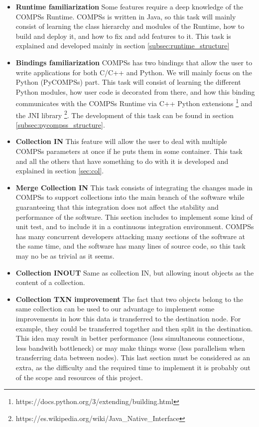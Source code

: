 \begin{itemize}
\item \textbf{Runtime familiarization} Some features require a deep knowledge of the COMPSs Runtime. COMPSs is written in Java, so this task will mainly consist of learning the class hierarchy and modules of the Runtime, how to build and deploy it, and how to fix and add features to it. This task is explained and developed mainly in section \ref{subsec:runtime_structure}

\item \textbf{Bindings familiarization} COMPSs has two bindings that allow the user to write applications for both C/C++ and Python. We will mainly focus on the Python (PyCOMPSs) part. This task will consist of learning the different Python modules, how user code is decorated from there, and how this binding communicates with the COMPSs Runtime via C++ Python extensions \footnote{https://docs.python.org/3/extending/building.html} and the JNI library \footnote{https://es.wikipedia.org/wiki/Java\_Native\_Interface}. The development of this task can be found in section \ref{subsec:pycompss_structure}.

\item \textbf{Collection IN} This feature will allow the user to deal with multiple COMPSs parameters at once if he puts them in some container. This task and all the others that have something to do with it is developed and explained in section \ref{sec:col}.

\item \textbf{Merge Collection IN} This task consists of integrating the changes made in COMPSs to support collections into the main branch of the software while guaranteeing that this integration does not affect the stability and performance of the software. This section includes to implement some kind of unit test, and to include it in a continuous integration environment. COMPSs has many concurrent developers attacking many sections of the software at the same time, and the software has many lines of source code, so this task may no be as trivial as it seems.

\item \textbf{Collection INOUT} Same as collection IN, but allowing inout objects as the content of a collection.

\item \textbf{Collection TXN improvement} The fact that two objects belong to the same collection can be used to our advantage to implement some improvements in how this data is transferred to the destination node. For example, they could be transferred together and then split in the destination. This idea may result in better performance (less simultaneous connections, less bandwith bottleneck) or may make things worse (less parallelism when transferring data between nodes). This last section must be considered as an extra, as the difficulty and the required time to implement it is probably out of the scope and resources of this project.


\end{itemize}
